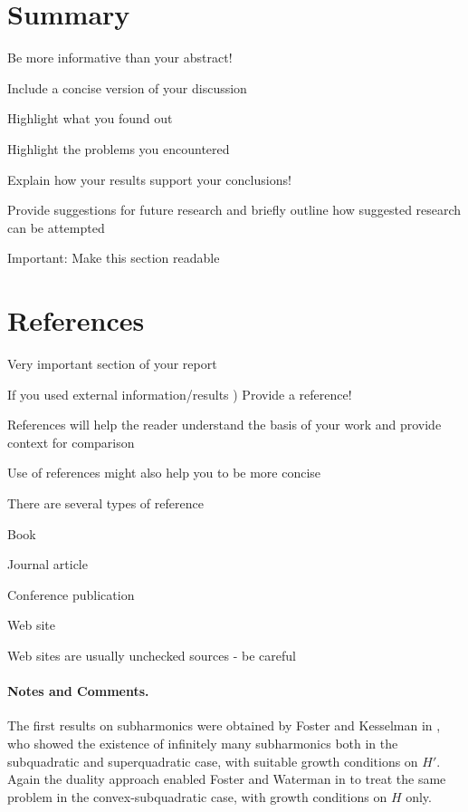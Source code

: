\documentclass[lnicst,a4paper]{svmultln}
\begin{document}

\section{Summary}

Be more informative than your abstract!

Include a concise version of your discussion

Highlight what you found out

Highlight the problems you encountered

Explain how your results support your conclusions!

Provide suggestions for future research and briefly outline how
suggested research can be attempted

Important:
Make this section readable





\section{References}
Very important section of your report

If you used external information/results
)
Provide a
reference!

References will help the reader understand the basis of your
work and provide context for comparison

Use of references might also help you to be more concise

There are several types of reference

Book

Journal article

Conference publication

Web site

Web sites are usually unchecked sources -
be careful





\paragraph{Notes and Comments.}
The first results on subharmonics were
obtained by Foster and Kesselman in \cite{fos:kes}, who showed the existence of
infinitely many subharmonics both in the subquadratic and superquadratic
case, with suitable growth conditions on $H'$. Again the duality
approach enabled Foster and Waterman in \cite{fos:kes:2} to treat the
same problem in the convex-subquadratic case, with growth conditions on
$H$ only.
\end{document}

